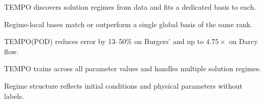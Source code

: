 \begin{highlights}
\item TEMPO discovers solution regimes from data and fits a dedicated basis to each.
\item Regime-local bases match or outperform a single global basis of the same rank.
\item TEMPO(POD) reduces error by 13--50\% on Burgers' and up to $4.75\times$ on Darcy flow.
\item TEMPO trains across all parameter values and handles multiple solution regimes.
\item Regime structure reflects initial conditions and physical parameters without labels.
\end{highlights}
